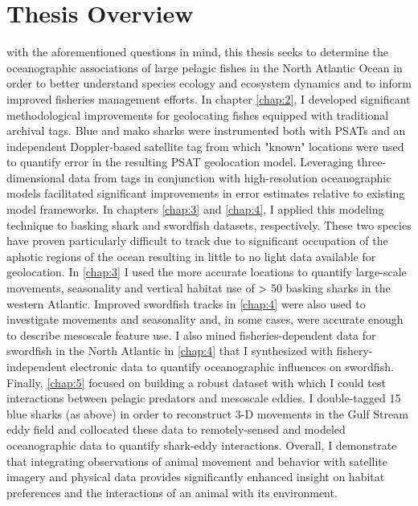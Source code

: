 \section{Thesis Overview}

with the aforementioned questions in mind, this thesis seeks to determine the oceanographic associations of large pelagic fishes in the North Atlantic Ocean in order to better understand species ecology and ecosystem dynamics and to inform improved fisheries management efforts. In chapter \ref{chap:2}, I developed significant methodological improvements for geolocating fishes equipped with traditional archival tags. Blue and mako sharks were instrumented both with PSATs and an independent Doppler-based satellite tag from which "known" locations were used to quantify error in the resulting PSAT geolocation model. Leveraging three-dimensional data from tags in conjunction with high-resolution oceanographic models facilitated significant improvements in error estimates relative to existing model frameworks. In chapters \ref{chap:3} and \ref{chap:4}, I applied this modeling technique to basking shark and swordfish datasets, respectively. These two species have proven particularly difficult to track due to significant occupation of the aphotic regions of the ocean resulting in little to no light data available for geolocation. In \cref{chap:3} I used the more accurate locations to quantify large-scale movements, seasonality and vertical habitat use of > 50 basking sharks in the western Atlantic. Improved swordfish tracks in \cref{chap:4} were also used to investigate movements and seasonality and, in some cases, were accurate enough to describe mesoscale feature use. I also mined fisheries-dependent data for swordfish in the North Atlantic in \cref{chap:4} that I synthesized with fishery-independent electronic data to quantify oceanographic influences on swordfish. Finally, \cref{chap:5} focused on building a robust dataset with which I could test interactions between pelagic predators and mesoscale eddies. I double-tagged 15 blue sharks (as above) in order to reconstruct 3-D movements in the Gulf Stream eddy field and collocated these data to remotely-sensed and modeled oceanographic data to quantify shark-eddy interactions. Overall, I demonstrate that integrating observations of animal movement and behavior with satellite imagery and physical data provides significantly enhanced insight on habitat preferences and the interactions of an animal with its environment.


